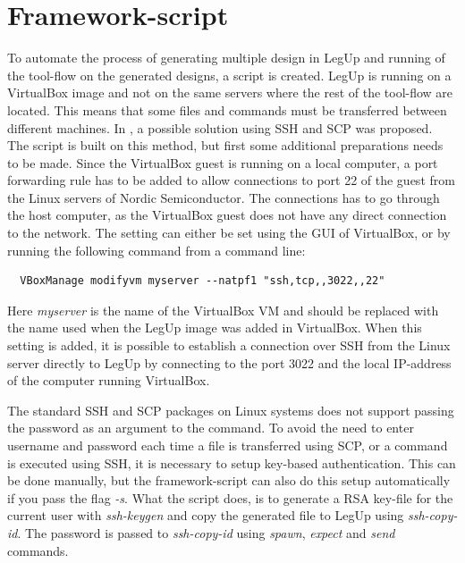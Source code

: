 \section{\label{sec:hlsscript}Framework-script}
To automate the process of generating multiple design in LegUp and running of the tool-flow on the generated designs, a script is created. LegUp is running on a VirtualBox image and not on the same servers where the rest of the tool-flow are located. This means that some files and commands must be transferred between different machines. In \cite{holm2015pro}, a possible solution using SSH and SCP was proposed. The script is built on this method, but first some additional preparations needs to be made. Since the VirtualBox guest is running on a local computer, a port forwarding rule has to be added to allow connections to port 22 of the guest from the Linux servers of Nordic Semiconductor. The connections has to go through the host computer, as the VirtualBox guest does not have any direct connection to the network. The setting can either be set using the GUI of VirtualBox, or by running the following command from a command line:
\begin{verbatim}
  VBoxManage modifyvm myserver --natpf1 "ssh,tcp,,3022,,22"  
\end{verbatim}
Here \textit{myserver} is the name of the VirtualBox VM and should be replaced with the name used when the LegUp image was added in VirtualBox. When this setting is added, it is possible to establish a connection over SSH from the Linux server directly to LegUp by connecting to the port 3022 and the local IP-address of the computer running VirtualBox.

The standard SSH and SCP packages on Linux systems does not support passing the password as an argument to the command. To avoid the need to enter username and password each time a file is transferred using SCP, or a command is executed using SSH, it is necessary to setup key-based authentication. This can be done manually, but the framework-script can also do this setup automatically if you pass the flag \textit{-s}. What the script does, is to generate a RSA key-file for the current user with \textit{ssh-keygen} and copy the generated file to LegUp using \textit{ssh-copy-id}. The password is passed to \textit{ssh-copy-id} using \textit{spawn}, \textit{expect} and \textit{send} commands.

